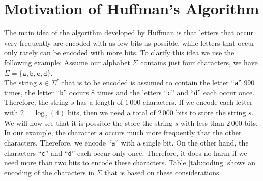 \section[Motivation]{Motivation of  Huffman's Algorithm}
The main idea of the
algorithm developed by Huffman is that letters that occur very frequently are encoded with
as few bits as possible, while letters that occur only rarely can be encoded with more bits. 
To clarify this idea we use the following example:  Assume our alphabet $\Sigma$ contains just four characters, we have
\\[0.2cm]
\hspace*{1.3cm}
$\Sigma = \{ \mathtt{a}, \mathtt{b}, \mathtt{c}, \texttt{d} \}$. 
\\[0.2cm]
The string $s \in \Sigma^*$ that is to be encoded is assumed to contain the letter
``\texttt{a}'' $990$ times, the letter ``\texttt{b}'' occurs $8$ times and the letters ``\texttt{c}'' and
``\texttt{d}'' each occur once.  Therefore, the string $s$ has a length of $1\,000$ characters.
If we encode each letter with $2 = \log_2(4)$ bits, then we need a total of $2\,000$ bits to store the string $s$.
We will now see that it is possible the store the string $s$ with less than $2\,000$ bits.
In our example, the character \texttt{a} occurs much more frequently that the other characters.  Therefore, we
encode ``\texttt{a}'' with a single bit.  On the other hand, the characters ``\texttt{c}'' and ``\texttt{d}''
each occur only once.  Therefore, it does no harm if we need more than two bits to encode these characters.
Table \ref{tab:coding} shows an encoding of the characters in $\Sigma$ that is based on these considerations.

